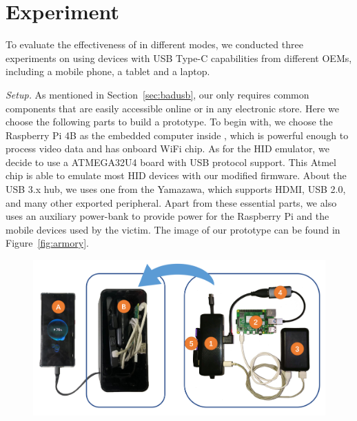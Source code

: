 \section{Experiment}
\label{sec:experiment}

To evaluate the effectiveness of \tool in different modes, we conducted three experiments on \tool using devices with USB Type-C capabilities from different OEMs, including a mobile phone, a tablet and a laptop.

\textit{Setup.} As mentioned in Section~\ref{sec:badusb}, our \tool only requires common components that are easily accessible online or in any electronic store. Here we choose the following parts to build a prototype. To begin with, we choose the Raspberry Pi 4B as the embedded computer inside \tool, which is powerful enough to process video data and has onboard WiFi chip. As for the HID emulator, we decide to use a ATMEGA32U4 board with USB protocol support. This Atmel chip is able to emulate most HID devices with our modified firmware. About the USB 3.x hub, we uses one from the Yamazawa, which supports HDMI, USB 2.0, and many other exported peripheral. Apart from these essential parts, we also uses an auxiliary power-bank to provide power for the Raspberry Pi and the mobile devices used by the victim. The image of our prototype \tool can be found in Figure~\ref{fig:armory}.

\begin{figure}[t]
	\centering
	\includegraphics[width=.98\linewidth]{./Figs/armory_all.png}
	\caption{\tool}
	\label{fig:PBS_products}
\end{figure}
